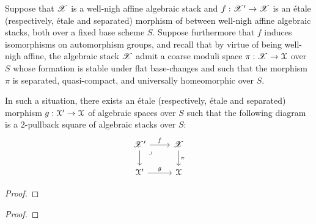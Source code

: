             \begin{proposition}
                Suppose that $\mathscr{X}$ is a well-nigh affine algebraic stack and $f: \mathscr{X}' \to \mathscr{X}$ is an \'etale (respectively, \'etale and separated) morphism of between well-nigh affine algebraic stacks, both over a fixed base scheme $S$. Suppose furthermore that $f$ induces isomorphisms on automorphism groups, and recall that by virtue of being well-nigh affine, the algebraic stack $\mathscr{X}$ admit a coarse moduli space $\pi: \mathscr{X} \to \mathcal{X}$ over $S$ whose formation is stable under flat base-changes and such that the morphism $\pi$ is separated, quasi-compact, and universally homeomorphic over $S$.
                
                In such a situation, there exists an \'etale (respectively, \'etale and separated) morphism $g: \mathcal{X}' \to \mathcal{X}$ of algebraic spaces over $S$ such that the following diagram is a $2$-pullback square of algebraic stacks over $S$:
                    $$
                        \begin{tikzcd}
                        	{\scrX'} & \scrX \\
                        	{\calX'} & \calX
                        	\arrow["\pi", from=1-2, to=2-2]
                        	\arrow["g", from=2-1, to=2-2]
                        	\arrow[from=1-1, to=2-1]
                        	\arrow["f", from=1-1, to=1-2]
                        	\arrow["\lrcorner"{anchor=center, pos=0.125}, draw=none, from=1-1, to=2-2]
                        \end{tikzcd}
                    $$
            \end{proposition}
                \begin{proof}
                    
                \end{proof}
                
            \begin{theorem} \label{theorem: keel_mori_theorem_on_the_existence_of_coarse_moduli_spaces}
                
            \end{theorem}
                \begin{proof}
                    
                \end{proof}
        
